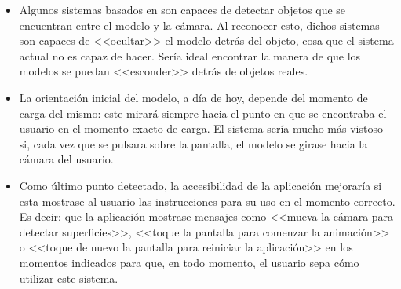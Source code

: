 \documentclass{subfiles}
\begin{document}
\begin{itemize}
        \item Algunos sistemas basados en \webxr son capaces de detectar objetos que se encuentran entre el modelo y la cámara. Al reconocer esto, dichos sistemas son capaces de <<ocultar>> el modelo detrás del objeto, cosa que el sistema actual no es capaz de hacer. Sería ideal encontrar la manera de que los modelos se puedan <<esconder>> detrás de objetos reales.
        \item La orientación inicial del modelo, a día de hoy, depende del momento de carga del mismo: este mirará siempre hacia el punto en que se encontraba el usuario en el momento exacto de carga. El sistema sería mucho más vistoso si, cada vez que se pulsara sobre la pantalla, el modelo se girase hacia la cámara del usuario.
        \item Como último punto detectado, la accesibilidad de la aplicación mejoraría si esta mostrase al usuario las instrucciones para su uso en el momento correcto. Es decir: que la aplicación mostrase mensajes como <<mueva la cámara para detectar superficies>>, <<toque la pantalla para comenzar la animación>> o <<toque de nuevo la pantalla para reiniciar la aplicación>> en los momentos indicados para que, en todo momento, el usuario sepa cómo utilizar este sistema.
    \end{itemize}
\end{document}
